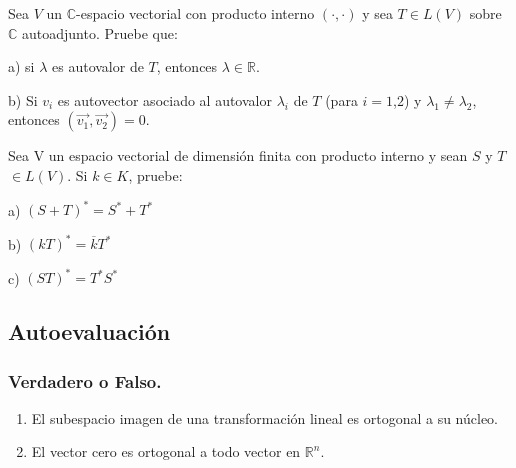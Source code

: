 {\begin{exercise}
Sea $V$ un $\mathbb{C}$-espacio vectorial con producto interno  $(\cdot,\cdot)$ y sea $T \in L(V)$ sobre $\mathbb{C}$ autoadjunto. Pruebe que:


a)  si $\lambda$ es autovalor  de $T$,  entonces  $\lambda  \in \mathbb{R}$.

b) Si $v_i$ es autovector asociado al autovalor $\lambda_i$ de $T$ (para $i=1$,$2$) y $\lambda_1 \neq \lambda_2$, entonces
$(\vec{v_1}, \Vec{v_2})=0$.

\end{exercise}
\begin{exercise}
\item

Sea V un espacio vectorial de dimensión finita con producto interno y sean $S$ y $T$ $\in L(V)$. Si $k \in K$, pruebe:

a) $(S+T)^*=S^*+T^*$

b) $(kT)^*=\overline k T^*$

c)  $(ST)^*=T^*S^*$
\end{exercise}




\bigskip
 

 \subsection{Autoevaluación}
 \label{Auto4}
 \bigskip



\subsubsection{Verdadero o Falso.}


\bigskip

\begin{enumerate}
  

\item
El subespacio imagen de una transformación lineal es ortogonal a su núcleo.

\item
El vector cero es ortogonal a todo vector en $\mathbb{R}^n$.


\end{enumerate}}
